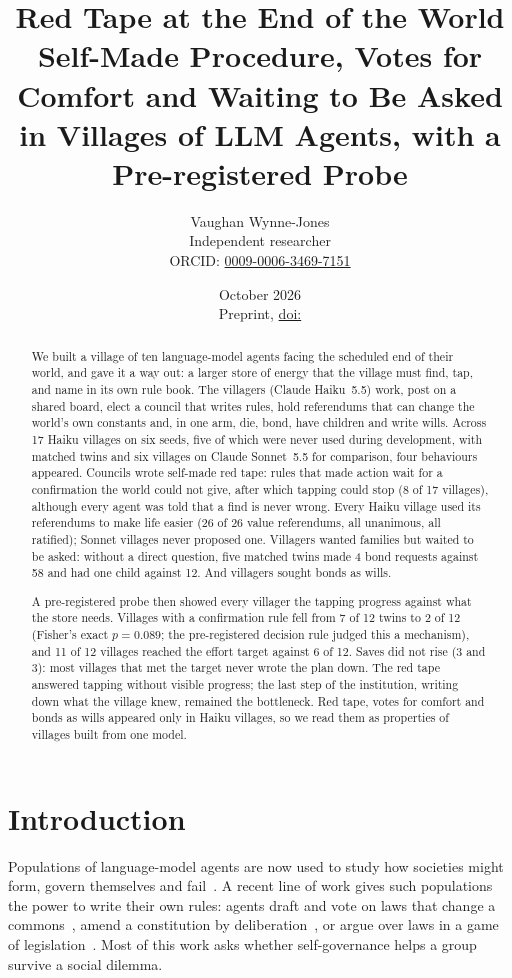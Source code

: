 \documentclass[11pt]{article}
\title{Red Tape at the End of the World\\[4pt]\large Self-Made Procedure, Votes for Comfort and Waiting to Be Asked in Villages of LLM Agents, with a Pre-registered Probe}
\author{Vaughan Wynne-Jones\\{\small Independent researcher}\\
{\small ORCID: \href{https://orcid.org/0009-0006-3469-7151}{0009-0006-3469-7151}}}
\date{October 2026\ifx\PAPERDOI\empty\else\\[2pt]{\small Preprint, \href{https://doi.org/\PAPERDOI}{doi:\PAPERDOI}}\fi}
\begin{document}
\maketitle

\begin{abstract}
We built a village of ten language-model agents facing the scheduled end of their world, and gave it a
way out: a larger store of energy that the village must find, tap, and name in its own rule book. The
villagers (Claude Haiku~5.5) work, post on a shared board, elect a council that writes rules, hold
referendums that can change the world's own constants and, in one arm, die, bond, have children and
write wills. Across 17 Haiku villages on six seeds, five of which were never used during development,
with matched twins and six villages on Claude Sonnet~5.5 for comparison, four behaviours appeared.
Councils wrote self-made red tape: rules that made action wait for a confirmation the world could not
give, after which tapping could stop (8 of 17 villages), although every agent was told that a find is
never wrong. Every Haiku village used its referendums to make life easier (26 of 26 value referendums,
all unanimous, all ratified); Sonnet villages never proposed one. Villagers wanted families but waited
to be asked: without a direct question, five matched twins made 4 bond requests against 58 and had one
child against 12. And villagers sought bonds as wills.

A pre-registered probe then showed every villager the tapping progress against what the store needs.
Villages with a confirmation rule fell from 7 of 12 twins to 2 of 12 (Fisher's exact $p=0.089$; the
pre-registered decision rule judged this a mechanism), and 11 of 12 villages reached the effort target
against 6 of 12. Saves did not rise (3 and 3): most villages that met the target never wrote the plan
down. The red tape answered tapping without visible progress; the last step of the institution, writing
down what the village knew, remained the bottleneck. Red tape, votes for comfort and bonds as wills
appeared only in Haiku villages, so we read them as properties of villages built from one model.
\end{abstract}

\section{Introduction}

Populations of language-model agents are now used to study how societies might form, govern
themselves and fail~\citep{park2023generative,altera2024sid,piatti2024cooperate}. A recent line of
work gives such populations the power to write their own rules: agents draft and vote on laws that
change a commons~\citep{rehm2026selfgovern}, amend a constitution by
deliberation~\citep{niranjani2026internal}, or argue over laws in a game of
legislation~\citep{hota2025nomiclaw}. Most of this work asks whether self-governance helps a group
survive a social dilemma.
\end{document}
